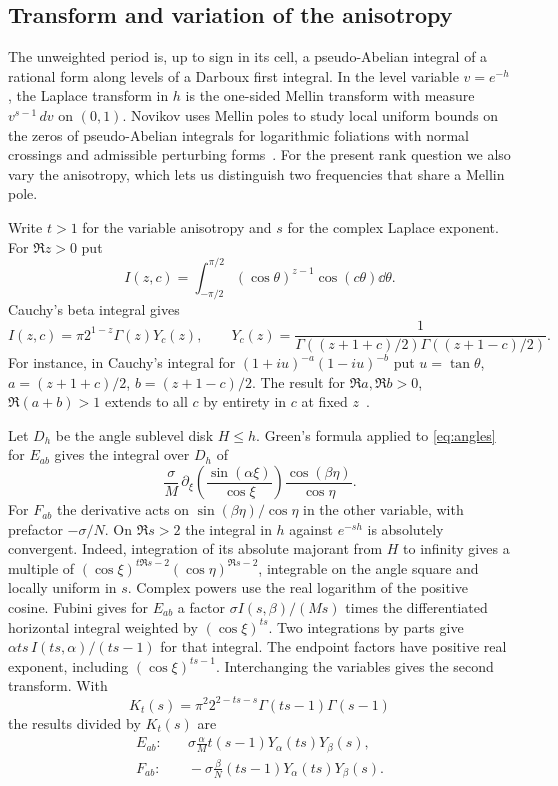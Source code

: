 \subsection{Transform and variation of the anisotropy}
The unweighted period is, up to sign in its cell, a pseudo-Abelian integral of a rational form along levels of a Darboux first integral. In the level variable $v=e^{-h}$, the Laplace transform in $h$ is the one-sided Mellin transform with measure $v^{s-1}\,dv$ on $(0,1)$. Novikov uses Mellin poles to study local uniform bounds on the zeros of pseudo-Abelian integrals for logarithmic foliations with normal crossings and admissible perturbing forms~\cite[Theorem 2 and Section 3.3]{novikov}. For the present rank question we also vary the anisotropy, which lets us distinguish two frequencies that share a Mellin pole.

Write $t>1$ for the variable anisotropy and $s$ for the complex Laplace exponent. For $\Re z>0$ put
\[
 I(z,c)=\int_{-\pi/2}^{\pi/2}(\cos\theta)^{z-1}\cos(c\theta)\dd\theta .
\]
Cauchy's beta integral gives
\begin{equation}\label{eq:beta}
 I(z,c)=\pi 2^{1-z}\Gamma(z)Y_c(z),\qquad
 Y_c(z)=\frac1{\Gamma((z+1+c)/2)\Gamma((z+1-c)/2)} .
\end{equation}
For instance, in Cauchy's integral for $(1+iu)^{-a}(1-iu)^{-b}$ put $u=\tan\theta$, $a=(z+1+c)/2$, $b=(z+1-c)/2$. The result for $\Re a,\Re b>0$, $\Re(a+b)>1$ extends to all $c$ by entirety in $c$ at fixed $z$~\cite[Eq.~5.12.8]{dlmf}.

Let $D_h$ be the angle sublevel disk $H\le h$. Green's formula applied to \eqref{eq:angles} for $E_{ab}$ gives the integral over $D_h$ of
\[
 \frac{\sigma}{M}\,\partial_\xi\!\left(\frac{\sin(\alpha\xi)}{\cos\xi}\right)
               \frac{\cos(\beta\eta)}{\cos\eta}.
\]
For $F_{ab}$ the derivative acts on $\sin(\beta\eta)/\cos\eta$ in the other variable, with prefactor $-\sigma/N$. On $\Re s>2$ the integral in $h$ against $e^{-sh}$ is absolutely convergent. Indeed, integration of its absolute majorant from $H$ to infinity gives a multiple of
$(\cos\xi)^{t\Re s-2}(\cos\eta)^{\Re s-2}$, integrable on the angle square and locally uniform in $s$. Complex powers use the real logarithm of the positive cosine. Fubini gives for $E_{ab}$ a factor $\sigma I(s,\beta)/(Ms)$ times the differentiated horizontal integral weighted by $(\cos\xi)^{ts}$. Two integrations by parts give $\alpha ts\,I(ts,\alpha)/(ts-1)$ for that integral. The endpoint factors have positive real exponent, including $(\cos\xi)^{ts-1}$. Interchanging the variables gives the second transform. With
\[
 K_t(s)=\pi^2 2^{2-ts-s}\Gamma(ts-1)\Gamma(s-1)
\]
the results divided by $K_t(s)$ are
\begin{align}
 E_{ab}:&\quad \sigma\frac{\alpha}{M}t(s-1)Y_\alpha(ts)Y_\beta(s),\nonumber\\
 F_{ab}:&\quad-\sigma\frac{\beta}{N}(ts-1)Y_\alpha(ts)Y_\beta(s).
 \label{eq:transforms}
\end{align}

